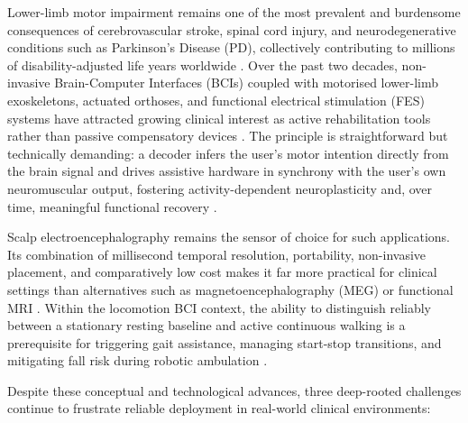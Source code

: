 \documentclass[11pt,a4paper]{article}
\begin{document}
Lower-limb motor impairment remains one of the most prevalent and burdensome consequences of cerebrovascular stroke, spinal cord injury, and neurodegenerative conditions such as Parkinson's Disease (PD), collectively contributing to millions of disability-adjusted life years worldwide \cite{who2022disability}. Over the past two decades, non-invasive Brain-Computer Interfaces (BCIs) coupled with motorised lower-limb exoskeletons, actuated orthoses, and functional electrical stimulation (FES) systems have attracted growing clinical interest as active rehabilitation tools rather than passive compensatory devices \cite{pfurtscheller2006bci, cheri2020exoskeleton}. The principle is straightforward but technically demanding: a decoder infers the user's motor intention directly from the brain signal and drives assistive hardware in synchrony with the user's own neuromuscular output, fostering activity-dependent neuroplasticity and, over time, meaningful functional recovery \cite{soekadar2015bci, leamy2021robotic}.

Scalp electroencephalography remains the sensor of choice for such applications. Its combination of millisecond temporal resolution, portability, non-invasive placement, and comparatively low cost makes it far more practical for clinical settings than alternatives such as magnetoencephalography (MEG) or functional MRI \cite{niederhauser2021wearable}. Within the locomotion BCI context, the ability to distinguish reliably between a stationary resting baseline and active continuous walking is a prerequisite for triggering gait assistance, managing start-stop transitions, and mitigating fall risk during robotic ambulation \cite{luu2017gait, kline2015locomotion}.

Despite these conceptual and technological advances, three deep-rooted challenges continue to frustrate reliable deployment in real-world clinical environments:
\end{document}
